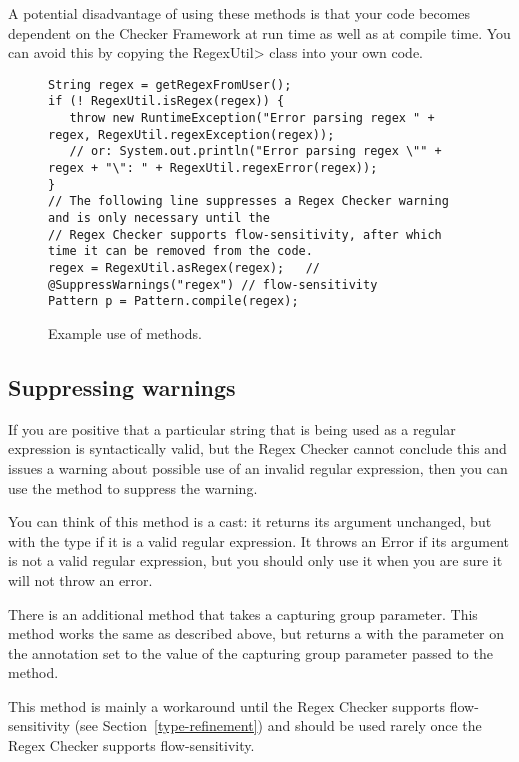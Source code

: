 A potential disadvantage of using these methods is that your code becomes
dependent on the Checker Framework at run time as well as at compile time.
You can avoid this by copying the \<RegexUtil> class into
your own code.

\begin{figure}
\begin{smaller}
\begin{Verbatim}
String regex = getRegexFromUser();
if (! RegexUtil.isRegex(regex)) {
   throw new RuntimeException("Error parsing regex " + regex, RegexUtil.regexException(regex));
   // or: System.out.println("Error parsing regex \"" + regex + "\": " + RegexUtil.regexError(regex));
}
// The following line suppresses a Regex Checker warning and is only necessary until the 
// Regex Checker supports flow-sensitivity, after which time it can be removed from the code.
regex = RegexUtil.asRegex(regex);   // @SuppressWarnings("regex") // flow-sensitivity
Pattern p = Pattern.compile(regex);
\end{Verbatim}
\end{smaller}
\caption{Example use of  methods.}
\label{fig:regex-util-example}
\end{figure}


\subsection{Suppressing warnings}

If you are positive that a particular string that is being used as a
regular expression is syntactically valid, but the Regex Checker cannot
conclude this and issues a warning about possible use of an invalid regular
expression, then you can use the
 method to suppress the
warning.

You can think of this method 
is a cast:  it returns its argument unchanged, but with the type
 if it is a valid regular expression.  It throws an
Error if its argument is not a valid regular expression, but you should
only use it when you are sure it will not throw an error.

There is an additional 
method that takes a capturing group parameter. This method works the same as
described above, but returns a  with the parameter on the
annotation set to the value of the capturing group parameter passed to the method.

This method is
mainly a workaround until the Regex Checker supports flow-sensitivity (see
Section~\ref{type-refinement}) and should be used rarely once the Regex
Checker supports flow-sensitivity.




